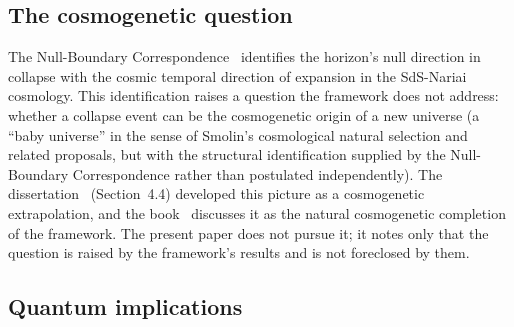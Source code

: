 \documentclass[11pt,a4paper]{article}
\theoremstyle{definition}
\begin{document}
\subsection{The cosmogenetic question}\label{sec:cosmogenesis}

The Null-Boundary Correspondence~\cite{JanzenCRcosmology} identifies the horizon's null direction in collapse with the cosmic temporal direction of expansion in the SdS-Nariai cosmology. This identification raises a question the framework does not address: whether a collapse event can be the cosmogenetic origin of a new universe (a ``baby universe'' in the sense of Smolin's cosmological natural selection and related proposals, but with the structural identification supplied by the Null-Boundary Correspondence rather than postulated independently). The dissertation~\cite{Janzen2012} (Section~4.4) developed this picture as a cosmogenetic extrapolation, and the book~\cite{Janzen2025} discusses it as the natural cosmogenetic completion of the framework. The present paper does not pursue it; it notes only that the question is raised by the framework's results and is not foreclosed by them.

\subsection{Quantum implications}\label{sec:quantum}
\end{document}
